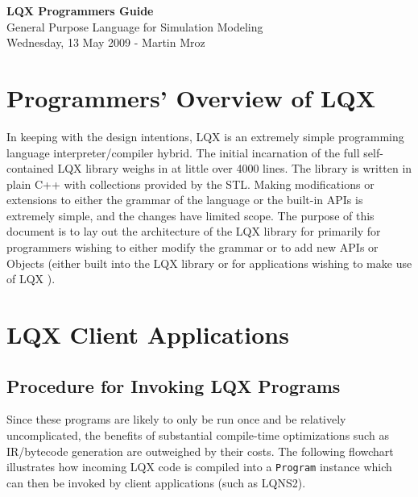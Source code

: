 \documentclass[]{article}
\newcommand{\ModLang}{LQX }
\begin{document}
  \ifpdf
  \else
  \fi
  
  
  \vskip 1.0in
  \pagestyle{empty}
  {\LARGE \textbf{\ModLang Programmers Guide}}\\
  {\large General Purpose Language for Simulation Modeling}\\
  {\small Wednesday, 13 May 2009 - Martin Mroz}
  \newpage
  
  
  \pagestyle{plain}
  \tableofcontents
  \newpage
  
  
  \section{Programmers' Overview of \ModLang}
  
  In keeping with the design intentions, \ModLang is an extremely simple
  programming language interpreter/compiler hybrid. The initial incarnation of
  the full self-contained \ModLang library weighs in at little over 4000 lines. The
  library is written in plain C++ with collections provided by the STL. Making 
  modifications or extensions to either the grammar of the language or the
  built-in APIs is extremely simple, and the changes have limited scope. The
  purpose of this document is to lay out the architecture of the \ModLang library
  for primarily for programmers wishing to either modify the grammar or to add
  new APIs or Objects (either built into the \ModLang library or for applications
  wishing to make use of \ModLang).
  
  \newpage
  
  \section{\ModLang Client Applications}
  \subsection{Procedure for Invoking \ModLang Programs}
  
  Since these programs are likely to only be run once and be relatively uncomplicated, 
  the benefits of substantial compile-time optimizations such as IR/bytecode generation 
  are outweighed by their costs. The following flowchart illustrates how incoming LQX
  code is compiled into a {\tt Program} instance which can then be invoked by client
  applications (such as LQNS2).
  
\end{document}
